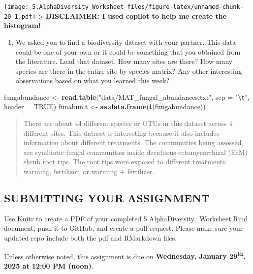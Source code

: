 \documentclass[
]{article}
\newenvironment{Shaded}{\begin{snugshade}}{\end{snugshade}}
\newcommand{\AttributeTok}[1]{\textcolor[rgb]{0.13,0.29,0.53}{#1}}
\newcommand{\ConstantTok}[1]{\textcolor[rgb]{0.56,0.35,0.01}{#1}}
\newcommand{\FunctionTok}[1]{\textcolor[rgb]{0.13,0.29,0.53}{\textbf{#1}}}
\newcommand{\NormalTok}[1]{#1}
\newcommand{\OtherTok}[1]{\textcolor[rgb]{0.56,0.35,0.01}{#1}}
\newcommand{\SpecialCharTok}[1]{\textcolor[rgb]{0.81,0.36,0.00}{\textbf{#1}}}
\newcommand{\StringTok}[1]{\textcolor[rgb]{0.31,0.60,0.02}{#1}}
\providecommand{\tightlist}{%
  \setlength{\itemsep}{0pt}\setlength{\parskip}{0pt}}
\begin{document}
\texttt{[image: 5.AlphaDiversity\_Worksheet\_files/figure-latex/unnamed-chunk-20-1.pdf]}
\textgreater{} \textbf{DISCLAIMER: I used copilot to help me create the
histogram!}

\begin{enumerate}
\def\labelenumi{\arabic{enumi}.}
\setcounter{enumi}{2}
\tightlist
\item
  We asked you to find a biodiversity dataset with your partner. This
  data could be one of your own or it could be something that you
  obtained from the literature. Load that dataset. How many sites are
  there? How many species are there in the entire site-by-species
  matrix? Any other interesting observations based on what you learned
  this week?
\end{enumerate}

\begin{Shaded}
\begin{Highlighting}[]
\NormalTok{fungabundance }\OtherTok{\textless{}{-}} \FunctionTok{read.table}\NormalTok{(}\StringTok{"data/MAT\_fungal\_abundances.txt"}\NormalTok{, }\AttributeTok{sep =} \StringTok{"}\SpecialCharTok{\textbackslash{}t}\StringTok{"}\NormalTok{, }\AttributeTok{header =} \ConstantTok{TRUE}\NormalTok{) }
\NormalTok{funabun.t }\OtherTok{\textless{}{-}} \FunctionTok{as.data.frame}\NormalTok{(}\FunctionTok{t}\NormalTok{(fungabundance))}
\end{Highlighting}
\end{Shaded}

\begin{quote}
There are about 44 different species or OTUs in this dataset across 4
different sites. This dataset is interesting because it also includes
information about different treatments. The communities being assessed
are symbiotic fungal communities inside deciduous ectomycorrhizal (EcM)
shrub root tips. The root tips were exposed to different treatments:
warming, fertilizer, or warming + fertilizer.
\end{quote}

\subsection{SUBMITTING YOUR
ASSIGNMENT}\label{submitting-your-assignment}

Use Knitr to create a PDF of your completed
5.AlphaDiversity\_Worksheet.Rmd document, push it to GitHub, and create
a pull request. Please make sure your updated repo include both the pdf
and RMarkdown files.

Unless otherwise noted, this assignment is due on \textbf{Wednesday,
January 29\textsuperscript{th}, 2025 at 12:00 PM (noon)}.
\end{document}
